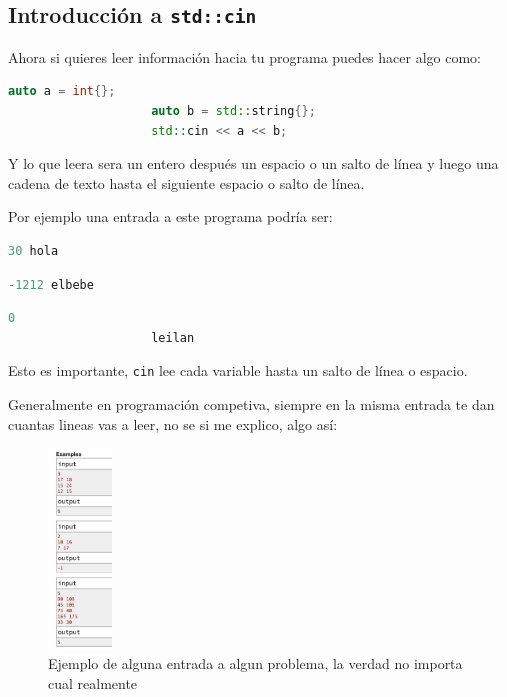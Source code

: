\documentclass[12pt, fleqn]{report}                             %
\theoremstyle{break}                                            %
\newcommand{\textCode}[1]  { \texttt{#1} }                      %
\begin{document}
            \subsection{Introducción a \textCode{std::cin}}
            
                Ahora si quieres leer información hacia tu programa puedes hacer algo como:
                \begin{lstlisting}[language=C++, gobble=20]
                    auto a = int{};
                    auto b = std::string{};
                    std::cin << a << b;        
                \end{lstlisting}

                Y lo que leera sera un entero después un espacio o un salto de línea y luego una cadena de
                texto hasta el siguiente espacio o salto de línea.

                Por ejemplo una entrada a este programa podría ser:
                \begin{lstlisting}[language=C++, gobble=20]
                   30 hola
                \end{lstlisting}
                \begin{lstlisting}[language=C++, gobble=20]
                    -1212 elbebe
                \end{lstlisting}
                \begin{lstlisting}[language=C++, gobble=20]
                    0
                    leilan
                \end{lstlisting}
                
                Esto es importante, \textCode{cin} lee cada variable hasta un salto de línea o espacio.

                Generalmente en programación competiva, siempre en la misma entrada te dan cuantas lineas vas a
                leer, no se si me explico, algo así:
                \begin{figure}[h]
                    \includegraphics[width=0.15\textwidth]{InputExample}
                    \caption{Ejemplo de alguna entrada a algun problema, la verdad no importa cual realmente}
                \end{figure}
\end{document}
